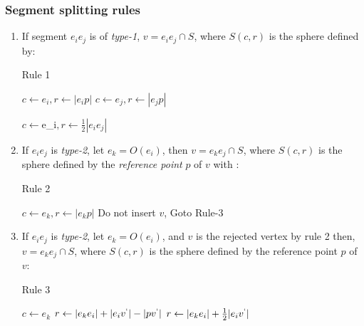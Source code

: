 \documentclass{beamer}
\begin{document}
\begin{frame}[allowframebreaks]
\frametitle{Segment splitting rules}
\begin{enumerate}
	\item	If segment $e_{i}e_{j}$ is of \textit{type-1}, $v = e_{i}e_{j}\cap S$, where $S(c, r)$ is the sphere defined by:
		\begin{algorithm}[H]
		\caption{Rule 1}
		\begin{algorithmic}[1]
				\State $c \gets e_i, r \gets |e_{i}p|$
				\State $c \gets e_j, r \gets |e_{j}p|$
			
			\Else
				\State $c \gets $e_i$, r \gets \frac{1}{2}|e_{i}e_{j}|$
			\EndIf	
		\EndProcedure
		\end{algorithmic}
		\end{algorithm}  
	\framebreak
	\item  If $e_{i}e_j$ is \textit{type-2}, let $e_k = O(e_i)$, then $v = e_{k}e_j \cap S$, where $S(c, r)$ is the sphere defined by the \textit{reference point} $p$ of $v$ with : 
	\begin{algorithm}[H]
	\caption{Rule 2}
	\begin{algorithmic}[1]
	            \State $c \gets e_{k}, r \gets |e_{k}p|$
	        \Else
	            \State Do not insert $v$, Goto Rule-3
	        \EndIf     
	    \EndProcedure
	\end{algorithmic}
	\end{algorithm}
    \framebreak
	\item If $e_{i}e_j$ is \textit{type-2}, let $e_k = O(e_i)$, and $v$ is the rejected vertex by rule 2 then, $v = e_{k}e_j \cap S$, where $S(c, r)$ is the sphere defined by the reference point $p$ of $v$:
	\begin{algorithm}[H]
	\caption{Rule 3}
	\begin{algorithmic}[1]
	        \State $c \gets e_k$
	            \State $r \gets |e_{k}e_{i}| + |e_{i}v^{`}| - |pv^{`}|$
	        \Else
	            \State $r \gets |e_{k}e_i| + \frac{1}{2}|e_{i}v^{`}|$
	        \EndIf
	    \EndProcedure
	\end{algorithmic}
	\end{algorithm}
\end{enumerate}
\end{frame}
\end{document}

